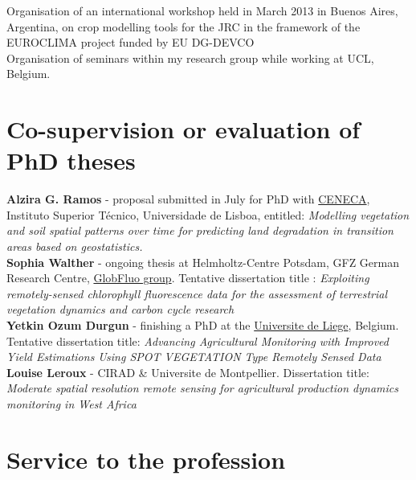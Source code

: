\documentclass[11pt, a4paper]{article} %
\newcommand{\years}[1]{\marginnote{\scriptsize #1}} %
\begin{document}
\years{\raggedleft2013} Organisation of an international workshop held in March 2013 in Buenos Aires, Argentina, on crop modelling tools for the JRC in the framework of the EUROCLIMA project funded by EU DG-DEVCO\\

\years{\raggedleft2006-2010} Organisation of seminars within my research group while working at UCL, Belgium.


\section*{Co-supervision or evaluation of PhD theses}

\textbf{Alzira G. Ramos} - proposal submitted in July for PhD with \href{http://cerena.ist.utl.pt/}{CENECA}, Instituto Superior Técnico, Universidade de Lisboa, entitled: \textit{Modelling vegetation and soil spatial patterns over time for predicting land degradation in transition areas based on geostatistics.}\\

\textbf{Sophia Walther} - ongoing thesis at Helmholtz-Centre Potsdam, GFZ German Research Centre, \href{http://www.gfz-potsdam.de/en/section/remote-sensing/topics/global-monitoring-of-vegetation-fluorescence-globfluo/}{GlobFluo group}. Tentative dissertation title : \textit{Exploiting remotely-sensed chlorophyll fluorescence data for the assessment of terrestrial vegetation dynamics and carbon cycle research}\\

\textbf{Yetkin Ozum Durgun} - finishing a PhD at the \href{http://www.eed.ulg.ac.be/en/}{Universite de Liege}, Belgium. Tentative dissertation title: \textit{Advancing Agricultural Monitoring with Improved Yield Estimations Using SPOT VEGETATION Type Remotely Sensed Data}\\

\textbf{Louise Leroux} - CIRAD \& Universite de Montpellier. Dissertation title: \textit{Moderate spatial resolution remote sensing for agricultural production dynamics monitoring in West Africa}




\section*{Service to the profession}
\end{document}
